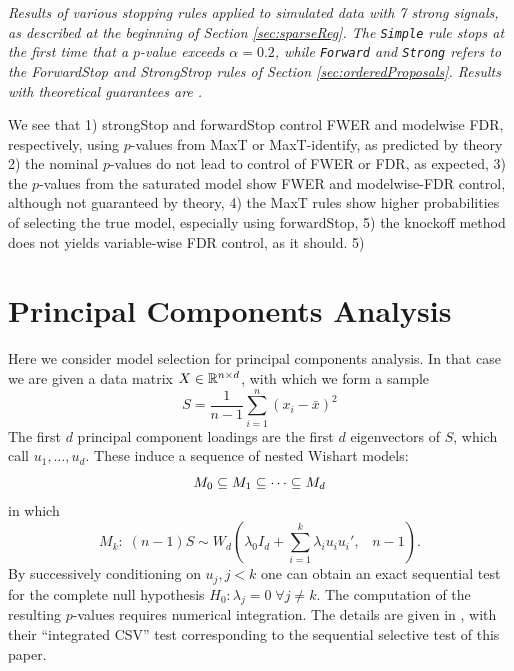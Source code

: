 \documentclass{article}
\begin{document}
\begin{table}[ht]
\centering

\caption[tab:stopping]{\em Results of various stopping rules applied to simulated data with 7 strong signals,  as described at the beginning of Section \ref{sec:sparseReg}.
The {\tt Simple} rule stops at the first time that a $p$-value exceeds $\alpha=0.2$, while {\tt Forward} and {\tt Strong} refers to the ForwardStop and StrongStrop rules of Section \ref{sec:orderedProposals}. Results with theoretical guarantees are .}
\label{tab:stopping20}
\end{table}

We see that 1) strongStop and forwardStop control FWER and modelwise FDR, respectively, using $p$-values from MaxT or MaxT-identify, as predicted by theory
2) the nominal $p$-values do not lead to control of FWER or FDR, as expected, 3) the $p$-values from the saturated model show FWER and modelwise-FDR control,
although not guaranteed by theory, 4) the MaxT rules show higher probabilities of selecting the true model, especially using forwardStop, 5) the knockoff method
does not yields variable-wise FDR control, as it should.
5)
\section{Principal Components Analysis}
\label{sec:pca}

Here we consider model selection for principal components analysis. In that case we are given a data matrix $X \in \mathbb{R}^{n\times d}$, with which we form a sample %
\[
S = \frac{1}{n-1} \sum_{i=1}^n(x_i - \bar x)^2
\]
The first $d$ principal component loadings are the first $d$ eigenvectors of $S$, which call $u_1,\ldots, u_d$. These induce a sequence of nested Wishart models:
\[
M_0 \subseteq M_1 \subseteq \cdots \subseteq M_d
\]
in which
\begin{equation}
  M_k:\; (n-1) S \sim W_d\left(\lambda_0 I_d + \sum_{i=1}^k     \lambda_i u_i u_i', \;\;\; n-1\right).
\end{equation}
 By successively conditioning on $u_j, j<k$ one can obtain an exact sequential test
for the complete null hypothesis $H_0: \lambda_j=0 \; \forall j \neq k$.  The computation of the resulting $p$-values requires numerical integration.
The details are given in \citet{choi2014selecting}, with their ``integrated CSV'' test  corresponding to the sequential selective test of this paper.

\end{document}
